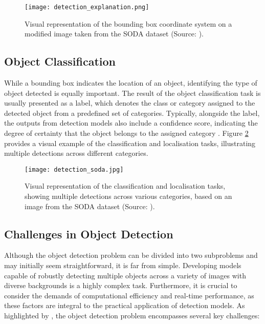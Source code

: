 \begin{figure}[!htbp]
    \centering
    \texttt{[image: detection\_explanation.png]}
    \caption{Visual representation of the bounding box coordinate system on a modified image taken from the SODA dataset (Source: \cite{soda_dataset}).}
    \label{fig:detection_explanation}
\end{figure}

\subsection{Object Classification}
\label{subsec:2_classification}

While a bounding box indicates the location of an object, identifying the type of object detected is equally important. The result of the object classification task is usually presented as a label, which denotes the class or category assigned to the detected object from a predefined set of categories. Typically, alongside the label, the outputs from detection models also include a confidence score, indicating the degree of certainty that the object belongs to the assigned category \cite{od_2}. Figure \ref{fig:classification_explanation} provides a visual example of the classification and localisation tasks, illustrating multiple detections across different categories.

\begin{figure}[!htbp]
    \centering
    \texttt{[image: detection\_soda.jpg]}
    \caption{Visual representation of the classification and localisation tasks, showing multiple detections across various categories, based on an image from the SODA dataset (Source: \cite{soda_dataset}).}
    \label{fig:classification_explanation}
\end{figure}

\subsection{Challenges in Object Detection}
\label{subsec:2_challenges}

Although the object detection problem can be divided into two subproblems and may initially seem straightforward, it is far from simple. Developing models capable of robustly detecting multiple objects across a variety of images with diverse backgrounds is a highly complex task. Furthermore, it is crucial to consider the demands of computational efficiency and real-time performance, as these factors are integral to the practical application of detection models. As highlighted by \cite{od_survey_problems}, the object detection problem encompasses several key challenges:

